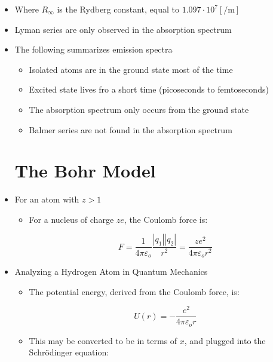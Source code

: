 \begin{itemize}
  \item Where $R_{\infty}$ is the Rydberg constant, equal to $1.097\cdot10^7 [\si{\per\meter}]$

  \item Lyman series are only observed in the absorption spectrum

  \item The following summarizes emission spectra

    \begin{itemize}

      \item Isolated atoms are in the ground state most of the time

      \item Excited state lives fro a short time (picoseconds to femtoseconds)

      \item The absorption spectrum only occurs from the ground state

      \item Balmer series are not found in the absorption spectrum

    \end{itemize}

    \section{The Bohr Model}

  \item For an atom with $z>1$

    \begin{itemize}

      \item For a nucleus of charge $ze$, the Coulomb force is:

        $$F=\frac{1}{4\pi\varepsilon_o}\frac{|q_1||q_2|}{r^2}=\frac{ze^2}{4\pi\varepsilon_o r^2}$$

    \end{itemize}

  \item Analyzing a Hydrogen Atom in Quantum Mechanics

    \begin{itemize}

      \item The potential energy, derived from the Coulomb force, is:

        $$U(r)=-\dfrac{e^2}{4\pi\varepsilon_o r}$$

      \item This may be converted to be in terms of $x$, and plugged into the Schr\"odinger equation:


\end{itemize}
\end{itemize}
